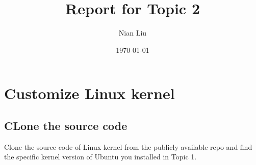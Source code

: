 \documentclass[twocolumn]{article}
\title{Report for Topic 2}
\author{Nian Liu}
\date{\today}
\begin{document}
 
	\maketitle
	\section{Customize Linux kernel}
	\subsection{CLone the source code}
	Clone the source code of Linux kernel from the publicly available repo and find the specific kernel version of Ubuntu you installed in Topic 1.
\end{document}
